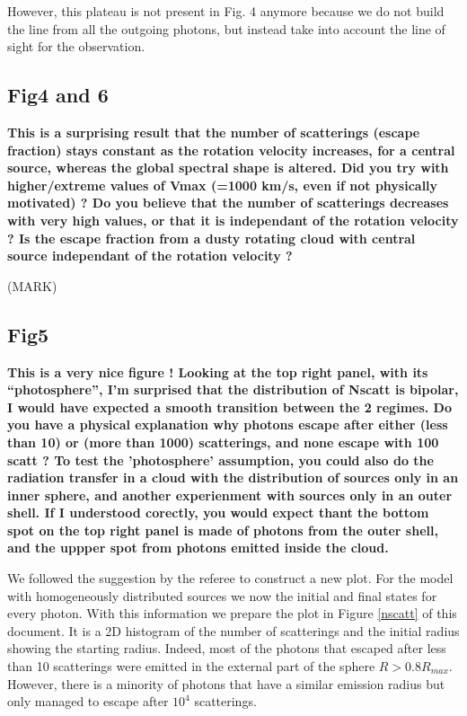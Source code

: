 \documentclass[12pt]{article}
\begin{document}
However, this plateau is not present in Fig. 4 anymore because we do
not build the line from all the outgoing photons, but instead take
into account the line of sight for the observation.


\subsection*{Fig4 and 6}

{\bf This is a surprising result that the number of scatterings
  (escape fraction) stays constant as the rotation velocity increases,
  for a central source, whereas the global spectral shape is
  altered. Did you try with higher/extreme values of Vmax (=1000 km/s,
  even if not physically motivated) ? Do you believe that the number
  of scatterings decreases with very high values, or that it is
  independant of the rotation velocity ? Is the escape fraction from a
  dusty rotating cloud with central source independant of the rotation
  velocity ?} 


(MARK) 



\subsection*{Fig5}

{\bf This is a very nice figure ! Looking at the top right panel, with
  its “photosphere”, I’m surprised that the distribution of Nscatt is
  bipolar, I would have expected a smooth transition between the 2
  regimes. Do you have a physical explanation why photons escape after
  either (less than 10) or (more than 1000) scatterings, and none
  escape with 100 scatt ? To test the ’photosphere’ assumption, you
  could also do the radiation transfer in a cloud with the
  distribution of sources only in an inner sphere, and another
  experienment with sources only in an outer shell. If I understood
  corectly, you would expect thant the bottom spot on the top right
  panel is made of photons from the outer shell, and the uppper spot
  from photons emitted inside the cloud.} 

We followed the suggestion by the referee to construct a new
plot. For the model with homogeneously distributed sources we now the
initial and final states for every photon. With this information we
prepare the plot in Figure \ref{nscatt} of this document. It is a 2D
histogram of the number of scatterings and the initial radius showing
the starting radius. Indeed, most of the photons that escaped after
less than 10 scatterings were emitted in the external part of the
sphere $R>0.8R_{max}$. However, there is a minority of photons that
have a similar emission radius but only managed to escape after $10^4$
scatterings. 
\end{document}
